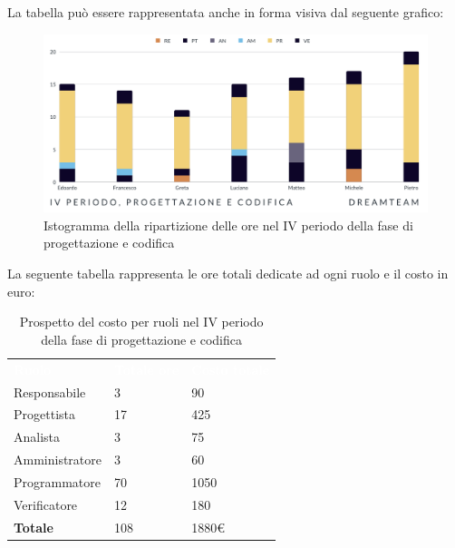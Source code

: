 La tabella può essere rappresentata anche in forma visiva dal seguente grafico:
\begin{figure}[H]
\centering
\includegraphics[scale=0.65]{Sezioni/SezioniPreventivo/grafici/Progettazione_codifica_IV_periodo.png}
\caption{Istogramma della ripartizione delle ore nel IV periodo della fase di progettazione e codifica}
\end{figure}

La seguente tabella rappresenta le ore totali dedicate ad ogni ruolo e il costo in euro:

\begin{table}[H]
\begin{center}
\renewcommand{\arraystretch}{1.5}
\begin{tabular}{ m{}<{\centering}  m{}<{\centering} m{}<{\centering}}
	\rowcolor{darkblue}
	\textcolor{white}{\textbf{Ruolo}}&\textcolor{white}{\textbf{Totale ore}}&\textcolor{white}{\textbf{Costo totale}}\\ 

	Responsabile  & 3 & 90 \\	
	
	Progettista & 17 & 425 \\
	
	Analista & 3 & 75 \\

	Amministratore & 3 & 60 \\
	
	Programmatore & 70 & 1050 \\
	
	Verificatore & 12 & 180 \\
	
	\textbf{Totale} & 108 & 1880\euro \\
	
\end{tabular}
\caption{Prospetto del costo per ruoli nel IV periodo della fase di progettazione e codifica}
\end{center}
\end{table}

